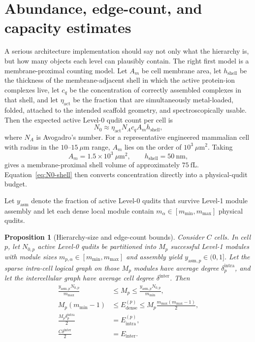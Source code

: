 \documentclass[11pt]{report}
\newtheorem{proposition}[theorem]{Proposition}
\theoremstyle{definition}
\begin{document}
\section{Abundance, edge-count, and capacity estimates}
A serious architecture implementation should say not only what the hierarchy is, but how many objects each level can plausibly contain. The right first model is a membrane-proximal counting model. Let $A_m$ be cell membrane area, let $h_{\mathrm{shell}}$ be the thickness of the membrane-adjacent shell in which the active protein-ion complexes live, let $c_q$ be the concentration of correctly assembled complexes in that shell, and let $\eta_{\mathrm{act}}$ be the fraction that are simultaneously metal-loaded, folded, attached to the intended scaffold geometry, and spectroscopically usable. Then the expected active Level-0 qudit count per cell is
\begin{equation}
N_0 \approx \eta_{\mathrm{act}} N_A c_q A_m h_{\mathrm{shell}},
\label{eq:N0-shell}
\end{equation}
where $N_A$ is Avogadro's number. For a representative engineered mammalian cell with radius in the $10$--$15~\mu\mathrm{m}$ range, $A_m$ lies on the order of $10^3~\mu\mathrm{m}^2$. Taking
\[
A_m = 1.5\times 10^3~\mu\mathrm{m}^2,
\qquad
h_{\mathrm{shell}} = 50~\mathrm{nm},
\]
gives a membrane-proximal shell volume of approximately $75~\mathrm{fL}$. Equation~\eqref{eq:N0-shell} then converts concentration directly into a physical-qudit budget.

Let $y_{\mathrm{asm}}$ denote the fraction of active Level-0 qudits that survive Level-1 module assembly and let each dense local module contain $m_\alpha \in [m_{\min},m_{\max}]$ physical qudits.

\begin{proposition}[Hierarchy-size and edge-count bounds]
\label{prop:hierarchy-bounds}
Consider $C$ cells. In cell $p$, let $N_{0,p}$ active Level-0 qudits be partitioned into $M_p$ successful Level-1 modules with module sizes $m_{p,\alpha}\in[m_{\min},m_{\max}]$ and assembly yield $y_{\mathrm{asm},p}\in(0,1]$. Let the sparse intra-cell logical graph on those $M_p$ modules have average degree $\delta^{\mathrm{intra}}_p$, and let the intercellular graph have average cell degree $\delta^{\mathrm{inter}}$. Then
\begin{align}
\frac{y_{\mathrm{asm},p}N_{0,p}}{m_{\max}}
&\le
M_p
\le
\frac{y_{\mathrm{asm},p}N_{0,p}}{m_{\min}},\\[3pt]
M_p(m_{\min}-1)
&\le
E^{(p)}_{\mathrm{dense}}
\le
M_p\frac{m_{\max}(m_{\max}-1)}{2},\\[3pt]
\frac{M_p\delta^{\mathrm{intra}}_p}{2}
&=
E^{(p)}_{\mathrm{intra}},\\[3pt]
\frac{C\delta^{\mathrm{inter}}}{2}
&=
E_{\mathrm{inter}}.
\end{align}
\end{proposition}
\end{document}
